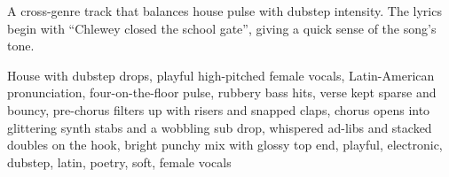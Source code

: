 

\begin{notes}
A cross-genre track that balances house pulse with dubstep intensity. %
The lyrics begin with “Chlewey closed the school gate”, giving a quick sense of the song’s tone.
\end{notes}

\begin{style}
House with dubstep drops, playful high-pitched female vocals, Latin-American pronunciation, four-on-the-floor pulse, rubbery bass hits, verse kept sparse and bouncy, pre-chorus filters up with risers and snapped claps, chorus opens into glittering synth stabs and a wobbling sub drop, whispered ad-libs and stacked doubles on the hook, bright punchy mix with glossy top end, playful, electronic, dubstep, latin, poetry, soft, female vocals
\end{style}

